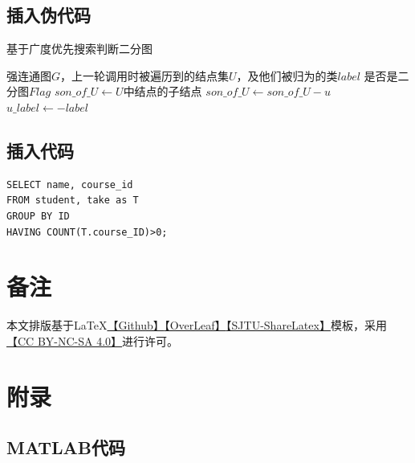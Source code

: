 \documentclass[a4paper]{article}
\begin{document}
\subsection{插入伪代码}

\begin{algorithm}  
    \caption{基于广度优先搜索判断二分图}  
    \begin{algorithmic}[1] 
        \Require  强连通图$G$，上一轮调用时被遍历到的结点集$U$，及他们被归为的类$label$
        \Ensure 是否是二分图$Flag$
            \State $son\_of\_U\gets U$中结点的子结点
            \State
            \State {}
            \Else {}
            \State $son\_of\_U\gets son\_of\_U - u$
            \Else {}
            \State $u\_label\gets -label$
            \EndIf
            \EndIf
            \EndForEach
            \State
            \State{}
            \Else {}
            \State {}
            \EndIf
        \EndFunction  
    \end{algorithmic}  
\end{algorithm}

\newpage
\subsection{插入代码}
\lstset{style=SQLStyle}
\begin{lstlisting}
SELECT name, course_id
FROM student, take as T
GROUP BY ID
HAVING COUNT(T.course_ID)>0;
\end{lstlisting}



\newpage
\section*{备注}
本文排版基于\LaTeX{}\href{https://github.com/JamesZhutheThird/A-Simple-LaTeX-Template}{【Github】}\href{https://cn.overleaf.com/read/mxmypkyfrzpz}{【OverLeaf】}\href{https://latex.sjtu.edu.cn/read/ndjrkpksrfzn}{【SJTU-ShareLatex】}模板，采用\href{http://creativecommons.org/licenses/by-nc-sa/4.0/}{【CC BY-NC-SA 4.0】}进行许可。





\section*{附录}
\subsection*{MATLAB代码}

\end{document}
